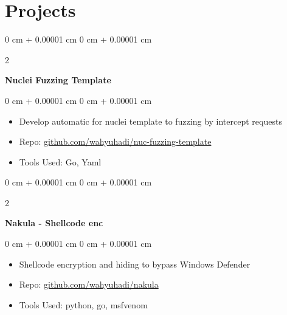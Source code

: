 \documentclass[10pt, letterpaper]{article}
\newenvironment{highlights}{
    \begin{itemize}[
        topsep=0.10 cm,
        parsep=0.10 cm,
        partopsep=0pt,
        itemsep=0pt,
        leftmargin=0 cm + 10pt
    ]
}{
    \end{itemize}
} %
\newenvironment{onecolentry}{
    \begin{adjustwidth}{
        0 cm + 0.00001 cm
    }{
        0 cm + 0.00001 cm
    }
}{
    \end{adjustwidth}
} %
\newenvironment{twocolentry}[2][]{
    \onecolentry
    \def\secondColumn{#2}
    \setcolumnwidth{\fill, 4.5 cm}
    \begin{paracol}{2}
}{
    \switchcolumn \raggedleft \secondColumn
    \end{paracol}
    \endonecolentry
} %
\begin{document}
    
    \section{Projects}


 \vspace{0.35 cm}
        
        \begin{twocolentry}{
           
        }
            \textbf{Nuclei Fuzzing Template}\end{twocolentry}

        \vspace{0.10 cm}
        \begin{onecolentry}
            \begin{highlights}
                \item Develop automatic for nuclei template to fuzzing by intercept requests 
                \item Repo: \href{https://github.com/wahyuhadi/nuc-fuzzing-template}{github.com/wahyuhadi/nuc-fuzzing-template}
                \item Tools Used: Go, Yaml
            \end{highlights}
        \end{onecolentry}


        \vspace{0.2 cm}

        \begin{twocolentry}{
          
        }
            \textbf{Nakula - Shellcode enc }\end{twocolentry}

        \vspace{0.10 cm}
        \begin{onecolentry}
            \begin{highlights}
                \item Shellcode encryption and hiding to bypass Windows Defender 
                \item Repo: \href{https://github.com/wahyuhadi/nakula}{github.com/wahyuhadi/nakula} 
                \item Tools Used: python, go, msfvenom
            \end{highlights}
        \end{onecolentry}


	        \vspace{0.2 cm}
	
\end{document}
